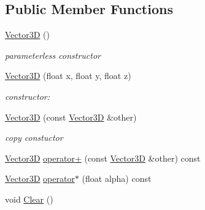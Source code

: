 \subsection*{\-Public \-Member \-Functions}
\begin{DoxyCompactItemize}
\item 
\hypertarget{class_vector3_d_a0b11a8d75da427b27443d8a94d0d296c}{
\hyperlink{class_vector3_d_a0b11a8d75da427b27443d8a94d0d296c}{\-Vector3\-D} ()}
\label{class_vector3_d_a0b11a8d75da427b27443d8a94d0d296c}

\begin{DoxyCompactList}\small\item\em parameterless constructor \end{DoxyCompactList}\item 
\hyperlink{class_vector3_d_a17ed921510dc931d9686b7d9333f6d57}{\-Vector3\-D} (float x, float y, float z)
\begin{DoxyCompactList}\small\item\em constructor\-: \end{DoxyCompactList}\item 
\hypertarget{class_vector3_d_ab44979be6b9bb7b514faa44b1c287eb4}{
\hyperlink{class_vector3_d_ab44979be6b9bb7b514faa44b1c287eb4}{\-Vector3\-D} (const \hyperlink{class_vector3_d}{\-Vector3\-D} \&other)}
\label{class_vector3_d_ab44979be6b9bb7b514faa44b1c287eb4}

\begin{DoxyCompactList}\small\item\em copy constuctor \end{DoxyCompactList}\item 
\hyperlink{class_vector3_d}{\-Vector3\-D} \hyperlink{class_vector3_d_a4f42a873d7f7bea9d2436bedb44baa94}{operator+} (const \hyperlink{class_vector3_d}{\-Vector3\-D} \&other) const 
\item 
\hyperlink{class_vector3_d}{\-Vector3\-D} \hyperlink{class_vector3_d_a7c02986f1641e3a086e547358bb95325}{operator$\ast$} (float alpha) const 
\item 
\hypertarget{class_vector3_d_ad55be818937566a3c83cdc0c6875db52}{
void \hyperlink{class_vector3_d_ad55be818937566a3c83cdc0c6875db52}{\-Clear} ()}
\label{class_vector3_d_ad55be818937566a3c83cdc0c6875db52}


\end{DoxyCompactItemize}
